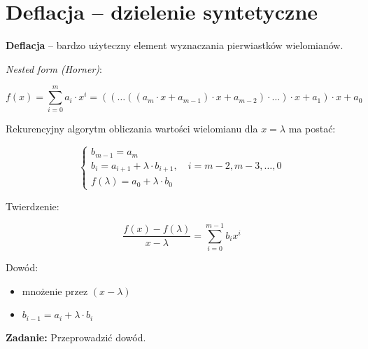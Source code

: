 \section{Deflacja -- dzielenie syntetyczne}

\begin{frame}
  \textbf{Deflacja} -- bardzo użyteczny element wyznaczania pierwiastków wielomianów. %

  \textit{Nested form (Horner)}:

  $$ f(x) = \sum_{i=0}^m a_i \cdot x^i = ( ( \dots (( a_m \cdot x + a_{m-1}) \cdot x + a_{m-2} ) \cdot \dots) \cdot x + a_1) \cdot x + a_0 $$
\end{frame}

\begin{frame}
  Rekurencyjny algorytm obliczania wartości wielomianu dla $x = \lambda$ ma postać:

  $$ \left \{ \begin{array}{l}
  b_{m-1} = a_m \\
  b_i = a_{i+1} + \lambda \cdot b_{i+1}, \quad i = m - 2, m-3, \dots, 0 \\
  f( \lambda ) = a_{0} + \lambda \cdot b_{0}
  \end{array} \right. $$
\end{frame}

\begin{frame}
  Twierdzenie:

  $$ \frac{f(x) - f(\lambda)}{x - \lambda} = \sum_{i=0}^{m-1} b_i x^i $$

  Dowód:

  \begin{itemize}
    \item mnożenie przez $(x - \lambda)$
    \item $ b_{i-1} = a_i + \lambda \cdot b_i $
  \end{itemize}

  \textbf{Zadanie:} Przeprowadzić dowód.
\end{frame}
